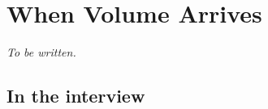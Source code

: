 \chapter{When Volume Arrives}
\label{ch:volume}


\emph{To be written.}

\section*{In the interview}

